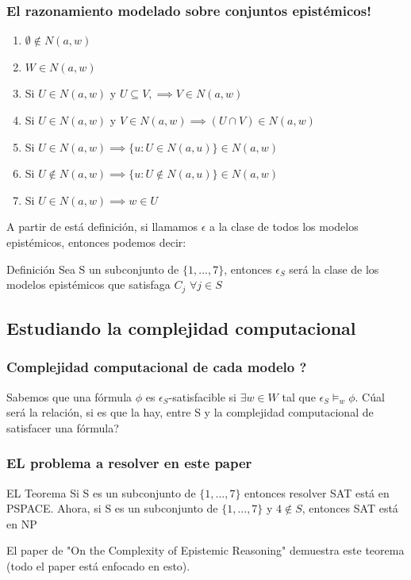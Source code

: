 \documentclass{beamer}
\begin{document}
\begin{frame}
\frametitle{El razonamiento modelado sobre conjuntos epist\'emicos!}
\begin{enumerate}
\item $\emptyset \notin N(a,w)$
\item $W \in N(a,w)$
\item Si $U \in N(a,w)$ y $U \subseteq V, \implies V \in N(a,w)$
\item Si $U \in N(a,w)$ y $V \in N(a,w) \implies (U \cap V) \in N(a,w)$
\item Si $U \in N(a,w) \implies \{u : U \in N(a,u)\} \in N(a,w)$
\item Si $U \notin N(a,w) \implies \{u : U \notin N(a,u)\} \in N(a,w)$
\item Si $U \in N(a,w) \implies w \in U$
\end{enumerate}

A partir de est\'a definici\'on, si llamamos $\epsilon$ a la clase de todos los modelos epist\'emicos, entonces podemos decir:

\begin{block}{Definici\'on}
Sea S un subconjunto de $\{1,...,7\}$, entonces $\epsilon_{S}$ ser\'a la clase de los modelos epist\'emicos que satisfaga $C_{j}$ $\forall j \in S$
\end{block} 
\end{frame}

\subsection{Estudiando la complejidad computacional}

\begin{frame}
\frametitle{Complejidad computacional de cada modelo ?}

Sabemos que una f\'ormula $\phi$ es $\epsilon_{S}$-satisfacible si $\exists w \in W$ tal que $\epsilon_{S} \models_{w} \phi$. C\'ual ser\'a la relaci\'on, si es que la hay, entre S y la complejidad computacional de satisfacer una f\'ormula?
\end{frame}

\begin{frame}
\frametitle{EL problema a resolver en este paper}

\begin{block}{EL Teorema}
 Si S es un subconjunto de $\{1, ..., 7\}$ entonces resolver SAT est\'a en PSPACE. Ahora, si S es un subconjunto de $\{1, ..., 7\}$ y $4 \notin S$, entonces SAT est\'a en NP
\end{block}

El paper de "On the Complexity of Epistemic Reasoning" demuestra este teorema (todo el paper est\'a enfocado en esto).
\end{frame}
\end{document}
